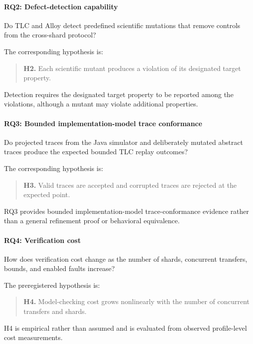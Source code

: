 \paragraph{RQ2: Defect-detection capability}

Do TLC and Alloy detect predefined scientific mutations that remove controls
from the cross-shard protocol?

The corresponding hypothesis is:

\begin{quote}
\textbf{H2.} Each scientific mutant produces a violation of its designated
target property.
\end{quote}

Detection requires the designated target property to be reported among the
violations, although a mutant may violate additional properties.

\paragraph{RQ3: Bounded implementation-model trace conformance}

Do projected traces from the Java simulator and deliberately mutated abstract
traces produce the expected bounded TLC replay outcomes?

The corresponding hypothesis is:

\begin{quote}
\textbf{H3.} Valid traces are accepted and corrupted traces are rejected at the
expected point.
\end{quote}

RQ3 provides bounded implementation-model trace-conformance evidence rather
than a general refinement proof or behavioral equivalence.

\paragraph{RQ4: Verification cost}

How does verification cost change as the number of shards, concurrent
transfers, bounds, and enabled faults increase?

The preregistered hypothesis is:

\begin{quote}
\textbf{H4.} Model-checking cost grows nonlinearly with the number of concurrent
transfers and shards.
\end{quote}

H4 is empirical rather than assumed and is evaluated from observed
profile-level cost measurements.

